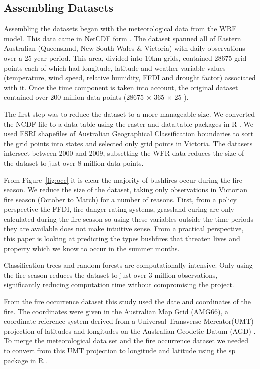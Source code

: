 \documentclass[11pt,a4paper]{article}
\begin{document}
\subsection{Assembling Datasets}

Assembling the datasets began with the meteorological data from the WRF model. This data came in NetCDF form \citep{ncdf}. The dataset spanned all of Eastern Australian (Queensland, New South Wales \& Victoria) with daily observations over a 25 year period. This area, divided into 10km grids, contained 28675 grid points each of which had longitude, latitude and weather variable values (temperature, wind speed, relative humidity, FFDI and drought factor) associated with it. Once the time component is taken into account, the original dataset contained over 200 million data points (28675 $\times$ 365 $\times$ 25 ).

The first step was to reduce the dataset to a more manageable size. We converted the NCDF file to a data table using the raster and data.table packages in R \citep{raster, datatable}. We used ESRI shapefiles of Australian Geographical Classification boundaries \citep{ABS1259} to sort the grid points into states and selected only grid points in Victoria. The datasets intersect between 2000 and 2009, subsetting the WFR data reduces the size of the dataset to just over 8 million data points.

From Figure~\ref{fig:occ} it is clear the majority of bushfires occur during the fire season. We reduce the size of the dataset, taking only observations in Victorian fire season (October to March) for a number of reasons. First, from a policy perspective the FFDI, fire danger rating systems, grassland curing are only calculated during the fire season so using these variables outside the time periods they are available does not make intuitive sense. From a practical perspective, this paper is looking at predicting the types bushfires that threaten lives and property which we know to occur in the summer months.

Classification trees and random forests are computationally intensive. Only using the fire season reduces the dataset to just over 3 million observations, significantly reducing computation time without compromising the project.

From the fire occurrence dataset this study used the date and coordinates of the fire. The coordinates were given in the Australian Map Grid (AMG66), a coordinate reference system derived from a Universal Transverse Mercator(UMT) projection of latitudes and longitudes on the Australian Geodetic Datum (AGD) \citep{featherstone96}. To merge the meteorological data set and the fire occurrence dataset we needed to convert from this UMT projection to longitude and latitude using the sp package in R \citep{sp08}.
\end{document}
